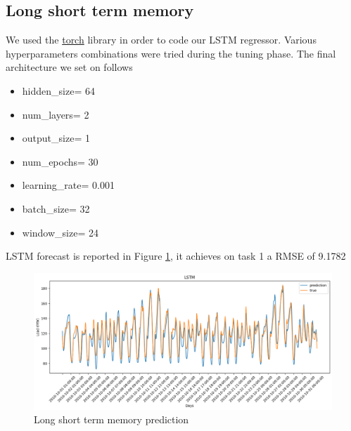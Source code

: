\subsection{Long short term memory}\label{sec:lstm point}
We used the \href{https://pytorch.org}{torch} library in order to code our LSTM regressor.
Various hyperparameters combinations were tried during the tuning phase. The final architecture we set on follows
\begin{itemize}
    \item hidden\_size= 64
    \item num\_layers= 2
    \item output\_size= 1
    \item num\_epochs= 30
    \item learning\_rate= 0.001
    \item batch\_size= 32
    \item window\_size= 24
\end{itemize}
LSTM forecast is reported in Figure \ref{fig:lstm_price}, it achieves on task 1 a RMSE of 9.1782
\begin{figure}[!ht]
    \includegraphics[width=\textwidth]{images/lstm_price.png}
    \caption{Long short term memory prediction}
    \label{fig:lstm_price}
\end{figure}


